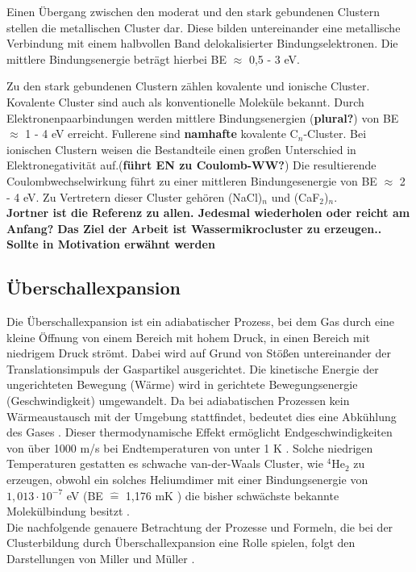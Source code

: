 Einen Übergang zwischen den moderat und den stark gebundenen Clustern stellen die metallischen Cluster dar. Diese bilden untereinander eine metallische Verbindung mit einem halbvollen Band delokalisierter Bindungselektronen. Die mittlere Bindungsenergie beträgt hierbei BE $\approx$ 0,5 - 3 eV.
 
 Zu den stark gebundenen Clustern zählen kovalente und ionische Cluster.
 Kovalente Cluster sind auch als konventionelle Moleküle bekannt. Durch Elektronenpaarbindungen  werden mittlere Bindungsenergien (\textbf{plural?}) von BE $\approx$ 1 - 4 eV erreicht. Fullerene sind \textbf{namhafte} kovalente C$_n$-Cluster. 
 Bei ionischen Clustern weisen die Bestandteile einen großen Unterschied in Elektronegativität auf.(\textbf{führt EN zu Coulomb-WW?}) Die resultierende Coulombwechselwirkung führt zu einer mittleren Bindungesenergie von BE $\approx$ 2 - 4 eV. Zu Vertretern dieser Cluster gehören (NaCl)$_n$ und (CaF$_2$)$_n$.\\
 \textbf{Jortner ist die Referenz zu allen. Jedesmal wiederholen oder reicht am Anfang?}
\textbf{Das Ziel der Arbeit ist Wassermikrocluster zu erzeugen.. Sollte in Motivation erwähnt werden}

\subsection{Überschallexpansion} \label{sec:uberschallexp}

Die Überschallexpansion ist ein adiabatischer Prozess, bei dem Gas durch eine kleine Öffnung von einem Bereich mit hohem Druck, in einen Bereich mit niedrigem Druck strömt. Dabei wird auf Grund von Stößen untereinander der Translationsimpuls der Gaspartikel ausgerichtet. Die kinetische Energie der ungerichteten Bewegung (Wärme) wird in gerichtete Bewegungsenergie (Geschwindigkeit) umgewandelt. Da bei adiabatischen Prozessen kein Wärmeaustausch mit der Umgebung stattfindet, bedeutet dies eine Abkühlung des Gases \cite{Vielteilch92}. Dieser thermodynamische Effekt ermöglicht Endgeschwindigkeiten von über 1000 m/s bei Endtemperaturen von unter 1 K \cite{mueller12}. 
Solche niedrigen Temperaturen gestatten es schwache van-der-Waals Cluster, wie  $\mathrm{^4}\mathrm{He}_2$ zu erzeugen, obwohl ein solches Heliumdimer mit einer Bindungsenergie von $\mathrm{1,013 \cdot 10^{-7}}$ eV (BE $\widehat{=}$ 1,176 mK \cite{Lohr2007}) die bisher schwächste bekannte Molekülbindung besitzt \cite{Luo1993}. \\
Die nachfolgende genauere Betrachtung der Prozesse und Formeln, die bei der Clusterbildung durch Überschallexpansion eine Rolle spielen, folgt den Darstellungen von Miller \cite{scoles1988} und Müller \cite{mul13}.

